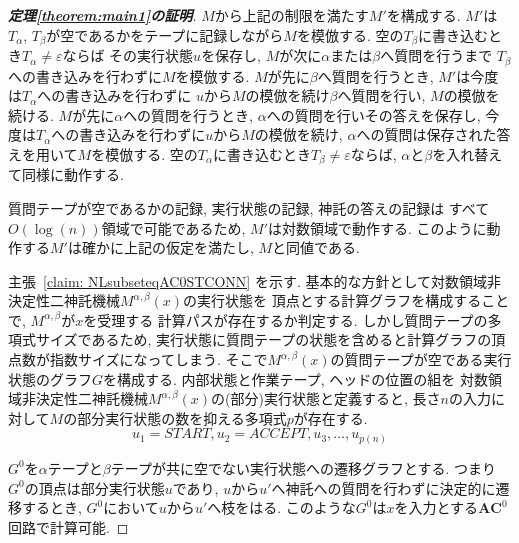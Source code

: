 \documentclass[10pt,a4paper,twocolumn]{jarticle}
\theoremstyle{definition}
\theoremstyle{remark}
\newcommand{\classfont}{\mathbf}
\newcommand{\AC}{\classfont{AC}}
\newcommand{\emptystring}{\varepsilon}
\begin{document}
\begin{proof}[\bf 定理\ref{theorem:main1}の証明]
$M$から上記の制限を満たす$M'$を構成する.
$M'$は$T_\alpha$, $T_\beta$が空であるかをテープに記録しながら$M$を模倣する.
空の$T_\beta$に書き込むとき$T_\alpha \not = \emptystring$ならば
その実行状態$u$を保存し, $M$が次に$\alpha$または$\beta$へ質問を行うまで
$T_\beta$への書き込みを行わずに$M$を模倣する.
$M$が先に$\beta$へ質問を行うとき, $M'$は今度は$T_\alpha$への書き込みを行わずに
$u$から$M$の模倣を続け$\beta$へ質問を行い, $M$の模倣を続ける.
$M$が先に$\alpha$への質問を行うとき, $\alpha$への質問を行いその答えを保存し,
今度は$T_\alpha$への書き込みを行わずに$u$から$M$の模倣を続け,
$\alpha$への質問は保存された答えを用いて$M$を模倣する.
空の$T_\alpha$に書き込むとき$T_\beta \not = \emptystring$ならば,
$\alpha$と$\beta$を入れ替えて同様に動作する.

質問テープが空であるかの記録, 実行状態の記録, 神託の答えの記録は
すべて$O(\log(n))$領域で可能であるため, $M'$は対数領域で動作する.
このように動作する$M'$は確かに上記の仮定を満たし, $M$と同値である.

\newcommand{\start}{\mathit{START}}
\newcommand{\accept}{\mathit{ACCEPT}}
主張~\ref{claim: NLsubseteqAC0STCONN} を示す.
基本的な方針として対数領域非決定性二神託機械$M^{\alpha, \beta}(x)$の実行状態を
頂点とする計算グラフを構成することで, $M^{\alpha, \beta}$が$x$を受理する
計算パスが存在するか判定する.
しかし質問テープの多項式サイズであるため, 
実行状態に質問テープの状態を含めると計算グラフの頂点数が指数サイズになってしまう.
そこで$M^{\alpha, \beta}(x)$の質問テープが空である実行状態のグラフ$G$を構成する.
内部状態と作業テープ, ヘッドの位置の組を
対数領域非決定性二神託機械$M^{\alpha, \beta}(x)$の(部分)実行状態と定義すると,
長さ$n$の入力に対して$M$の部分実行状態の数を抑える多項式$p$が存在する.
\[
 u_1=\mathit{START}, u_2=\mathit{ACCEPT}, u_3, \dots, u_{p(n)}
\]

$G^0$を$\alpha$テープと$\beta$テープが共に空でない実行状態への遷移グラフとする.
つまり$G^0$の頂点は部分実行状態$u$であり,
$u$から$u'$へ神託への質問を行わずに決定的に遷移するとき,
$G^0$において$u$から$u'$へ枝をはる.
このような$G^0$は$x$を入力とする$\AC^0$回路で計算可能.


\end{proof}
\end{document}
